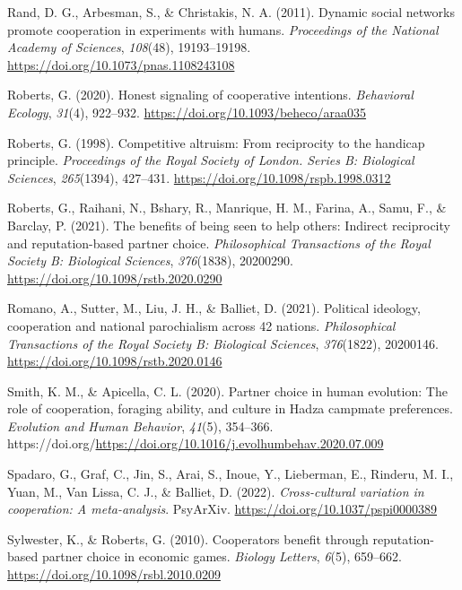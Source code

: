 \documentclass[
  man,floatsintext]{apa6}
\newlength{\cslhangindent}
\newlength{\cslentryspacingunit} %
\newenvironment{CSLReferences}[2] %
 {%
  \setlength{\parindent}{0pt}
  \ifodd #1
  \let\oldpar\par
  \def\par{\hangindent=\cslhangindent\oldpar}
  \fi
  \setlength{\parskip}{#2\cslentryspacingunit}
 }%
 {}
\begin{document}
\begin{CSLReferences}{1}{0}
\leavevmode{}%
Rand, D. G., Arbesman, S., \& Christakis, N. A. (2011). Dynamic social networks promote cooperation in experiments with humans. \emph{Proceedings of the National Academy of Sciences}, \emph{108}(48), 19193--19198. \url{https://doi.org/10.1073/pnas.1108243108}

\leavevmode{}%
Roberts, G. (2020). Honest signaling of cooperative intentions. \emph{Behavioral Ecology}, \emph{31}(4), 922--932. \url{https://doi.org/10.1093/beheco/araa035}

\leavevmode{}%
Roberts, G. (1998). Competitive altruism: From reciprocity to the handicap principle. \emph{Proceedings of the Royal Society of London. Series B: Biological Sciences}, \emph{265}(1394), 427--431. \url{https://doi.org/10.1098/rspb.1998.0312}

\leavevmode{}%
Roberts, G., Raihani, N., Bshary, R., Manrique, H. M., Farina, A., Samu, F., \& Barclay, P. (2021). The benefits of being seen to help others: Indirect reciprocity and reputation-based partner choice. \emph{Philosophical Transactions of the Royal Society B: Biological Sciences}, \emph{376}(1838), 20200290. \url{https://doi.org/10.1098/rstb.2020.0290}

\leavevmode{}%
Romano, A., Sutter, M., Liu, J. H., \& Balliet, D. (2021). Political ideology, cooperation and national parochialism across 42 nations. \emph{Philosophical Transactions of the Royal Society B: Biological Sciences}, \emph{376}(1822), 20200146. \url{https://doi.org/10.1098/rstb.2020.0146}

\leavevmode{}%
Smith, K. M., \& Apicella, C. L. (2020). Partner choice in human evolution: The role of cooperation, foraging ability, and culture in {Hadza} campmate preferences. \emph{Evolution and Human Behavior}, \emph{41}(5), 354--366. https://doi.org/\url{https://doi.org/10.1016/j.evolhumbehav.2020.07.009}

\leavevmode{}%
Spadaro, G., Graf, C., Jin, S., Arai, S., Inoue, Y., Lieberman, E., Rinderu, M. I., Yuan, M., Van Lissa, C. J., \& Balliet, D. (2022). \emph{Cross-cultural variation in cooperation: A meta-analysis}. PsyArXiv. \url{https://doi.org/10.1037/pspi0000389}

\leavevmode{}%
Sylwester, K., \& Roberts, G. (2010). Cooperators benefit through reputation-based partner choice in economic games. \emph{Biology Letters}, \emph{6}(5), 659--662. \url{https://doi.org/10.1098/rsbl.2010.0209}


\end{CSLReferences}
\end{document}
